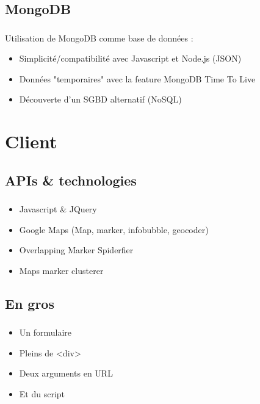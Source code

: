 \documentclass[10pt]{beamer}
\begin{document}
\subsection{MongoDB}
\begin{frame}
	\frametitle{\secname}
	\framesubtitle{\subsecname}
	Utilisation de MongoDB comme base de données :
	\begin{itemize}
		\item Simplicité/compatibilité avec Javascript et Node.js (JSON)
		\item Données "temporaires" avec la feature MongoDB Time To Live
		\item Découverte d'un SGBD alternatif (NoSQL)
	\end{itemize}
\end{frame}

\section{Client}
\subsection{APIs \& technologies}
\begin{frame}
	\frametitle{\secname}
	\framesubtitle{\subsecname}
	\begin{itemize}
		\item Javascript \& JQuery
		\item Google Maps (Map, marker, infobubble, geocoder)
		\item Overlapping Marker Spiderfier
		\item Maps marker clusterer
	\end{itemize}
\end{frame}

\subsection{En gros}
\begin{frame}
	\frametitle{\secname}
	\framesubtitle{\subsecname}
	\begin{itemize}
		\item Un formulaire
		\item Pleins de <div>
		\item Deux arguments en URL
		\item Et du script
	\end{itemize}
\end{frame}
\end{document}
